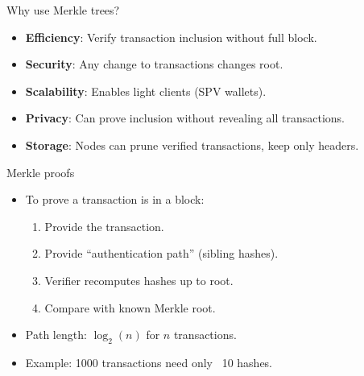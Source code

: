 \documentclass[aspectratio=169, lualatex, handout]{beamer}
\begin{document}
\begin{frame}{Why use Merkle trees?}
	\begin{itemize}
		\item \textbf{Efficiency}: Verify transaction inclusion without full block.
		\item \textbf{Security}: Any change to transactions changes root.
		\item \textbf{Scalability}: Enables light clients (SPV wallets).
		\item \textbf{Privacy}: Can prove inclusion without revealing all transactions.
		\item \textbf{Storage}: Nodes can prune verified transactions, keep only headers.
	\end{itemize}
\end{frame}

\begin{frame}{Merkle proofs}
	\begin{itemize}
		\item To prove a transaction is in a block:
		      \begin{enumerate}
			      \item Provide the transaction.
			      \item Provide ``authentication path'' (sibling hashes).
			      \item Verifier recomputes hashes up to root.
			      \item Compare with known Merkle root.
		      \end{enumerate}
		\item Path length: $\log_2(n)$ for $n$ transactions.
		\item Example: 1000 transactions need only ~10 hashes.
	\end{itemize}
\end{frame}
\end{document}
